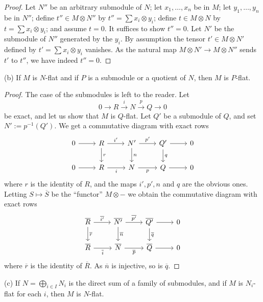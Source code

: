 \documentclass[parskip=half,fontsize=12pt]{scrartcl}%
\begin{document}
\begin{proof} 
Let $N''$ be an arbitrary submodule of $N$; let $x_1,\dots,x_n$ be in $M$; let $y_1,\dots,y_n$ be in $N''$; define $t''\in M\otimes N''$ by $t''=\sum x_i\otimes y_i$; define $t\in M\otimes N$ by $t=\sum x_i\otimes y_i$; and assume $t=0$. It suffices to show $t''=0$. Let $N'$ be the submodule of $N''$ generated by the $y_i$. By assumption the tensor $t'\in M\otimes N'$ defined by $t'=\sum x_i\otimes y_i$ vanishes. As the natural map $M\otimes N'\to M\otimes N''$ sends $t'$ to $t''$, we have indeed $t''=0$. 
\end{proof}

(b) If $M$ is $N$-flat and if $P$ is a submodule or a quotient of $N$, then $M$ is $P$-flat.%

\begin{proof} 
The case of the submodules is left to the reader. Let 
$$
0\to R\xrightarrow iN\xrightarrow pQ\to0
$$ 
be exact, and let us show that $M$ is $Q$-flat. Let $Q'$ be a submodule of $Q$, and set $N':=p^{-1}(Q')$. We get a commutative diagram with exact rows
$$
\begin{tikzcd}
0\ar[r]&R\ar[d,"r"]\ar[r,"i'"]&N'\ar[d,"n"]\ar[r,"p'"]& Q'\ar[d,"q"]\ar[r]&0\\ 
0\ar[r]&R\ar[r,"i"']&N\ar[r,"p"']& Q\ar[r]&0
\end{tikzcd}
$$ 
where $r$ is the identity of $R$, and the maps $i',p',n$ and $q$ are the obvious ones. Letting $S\mapsto\overline S$ be the ``functor'' $M\otimes-$ we obtain the commutative diagram with exact rows
$$
\begin{tikzcd}
\overline R\ar[d,"\overline r"]\ar[r,"\overline{i'}"]&\overline{N'}\ar[d,"\overline n"]\ar[r,"\overline{p'}"]& \overline{Q'}\ar[d,"\overline q"]\ar[r]&0\\ 
\overline R\ar[r,"\overline i"']&\overline N\ar[r,"\overline p"']& \overline Q\ar[r]&0
\end{tikzcd}
$$ 
where $\overline r$ is the identity of $\overline R$. As $\overline n$ is injective, so is $\overline q$. 
\end{proof}

(c) If $N=\bigoplus_{i\in I}N_i$ is the direct sum of a family of submodules, and if $M$ is $N_i$-flat for each $i$, then $M$ is $N$-flat.%
\end{document}
